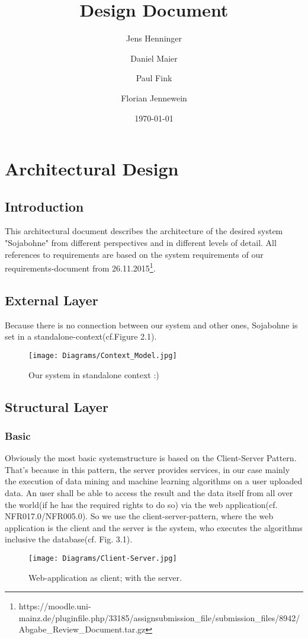 \documentclass{book}
\title{Design Document}
\author{Jens Henninger \and Daniel Maier \and Paul Fink \and Florian Jennewein}
\date{\today}
\begin{document}
\frontmatter
\maketitle
\tableofcontents
\mainmatter
\part{Architectural Design}

\chapter{Introduction}
This architectural document describes the architecture of the desired system 
"Sojabohne" from different perspectives and in different levels of detail. 
All references to requirements are based on the system requirements of our requirements-document from 26.11.2015\footnote{https://moodle.uni-mainz.de/pluginfile.php/33185/assignsubmission\_file/submission\_files/8942/Abgabe\_Review\_Document.tar.gz}.
\chapter{External Layer}
Because there is no connection between our system and other ones,
 Sojabohne is set in a standalone-context(cf.Figure 2.1). 
\begin{figure}[H]
\centering
\texttt{[image: Diagrams/Context\_Model.jpg]}
\caption{Our system in standalone context :)}
\label{Fig. 1}
\end{figure}
\chapter{Structural Layer}
\section{Basic}
Obviously the most basic systemstructure is based on the Client-Server Pattern.
That's because in this pattern, the server provides services, in our case mainly
the execution of data mining and machine learning algorithms on a user uploaded data.
An user shall be able to access the result and the data itself from all over the
world(if he has the required rights to do so) via the web application(cf. NFR017.0/NFR005.0). 
So we use the client-server-pattern, where the web application is the client and the server
is the system, who executes the algorithms inclusive the database(cf. Fig. 3.1).
\begin{figure}[H]
\centering
\texttt{[image: Diagrams/Client-Server.jpg]}
\caption{Web-application as client; with the server.}
\label{Fig. 2}
\end{figure}
\end{document}
